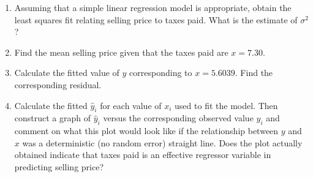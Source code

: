 {    \begin{enumerate}[label=(\alph*)]
        \item Assuming that a simple linear regression model is appropriate, obtain the least squares fit relating selling price to taxes paid.
        What is the estimate of $\sigma^{2}$?
        \item Find the mean selling price given that the taxes paid are $x = 7.30$.
        \item Calculate the fitted value of $y$ corresponding to $x = 5.6039$.
        Find the corresponding residual.
        \item Calculate the fitted $\hat{y}_{i}$ for each value of $x_{i}$ used to fit the model.
        Then construct a graph of $\hat{y}_{i}$ versus the corresponding observed value $y_{i}$ and comment on what this plot would look like if the relationship between $y$ and $x$ was a deterministic (no random error) straight line.
        Does the plot actually obtained indicate that taxes paid is an effective regressor variable in predicting selling price?
    \end{enumerate}
}


